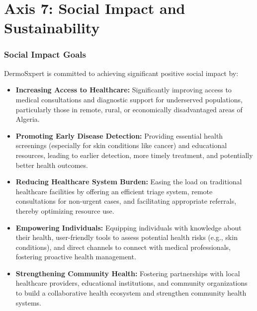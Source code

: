 \chapter{Axis 7: Social Impact and Sustainability}

\subsection{Social Impact Goals}
DermoSxpert is committed to achieving significant positive social impact by:
\begin{itemize}
  \item \textbf{Increasing Access to Healthcare:} Significantly improving access to medical consultations and diagnostic support for underserved populations, particularly those in remote, rural, or economically disadvantaged areas of Algeria.
  \item \textbf{Promoting Early Disease Detection:} Providing essential health screenings (especially for skin conditions like cancer) and educational resources, leading to earlier detection, more timely treatment, and potentially better health outcomes.
  \item \textbf{Reducing Healthcare System Burden:} Easing the load on traditional healthcare facilities by offering an efficient triage system, remote consultations for non-urgent cases, and facilitating appropriate referrals, thereby optimizing resource use.
  \item \textbf{Empowering Individuals:} Equipping individuals with knowledge about their health, user-friendly tools to assess potential health risks (e.g., skin conditions), and direct channels to connect with medical professionals, fostering proactive health management.
  \item \textbf{Strengthening Community Health:} Fostering partnerships with local healthcare providers, educational institutions, and community organizations to build a collaborative health ecosystem and strengthen community health systems.
\end{itemize}

